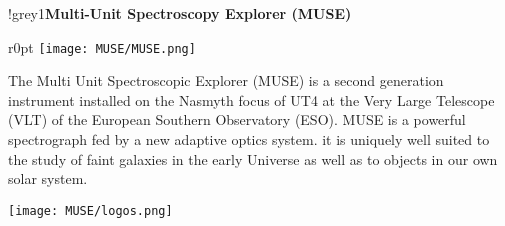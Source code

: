 \begin{gbox}{{\LARGE !}}{grey1}{{\large \textbf{Multi-Unit Spectroscopy Explorer
      (MUSE)}}}
  \begin{minipage}{\linewidth}
    \begin{wrapfigure}{r}{0pt}
      \texttt{[image: MUSE/MUSE.png]}
    \end{wrapfigure}
    \strut {\small The Multi Unit Spectroscopic Explorer (MUSE) is a second
      generation instrument installed on the Nasmyth focus of UT4 at the Very
      Large Telescope (VLT) of the European Southern Observatory (ESO). MUSE is
      a powerful spectrograph fed by a new adaptive optics system. it is
      uniquely well suited to the study of faint galaxies in the early Universe
      as well as to objects in our own solar system.}
  \end{minipage}

  \vspace{1cm}

  \begin{minipage}{\linewidth}
    \begin{center}
      \texttt{[image: MUSE/logos.png]}
    \end{center}
  \end{minipage}
\end{gbox}